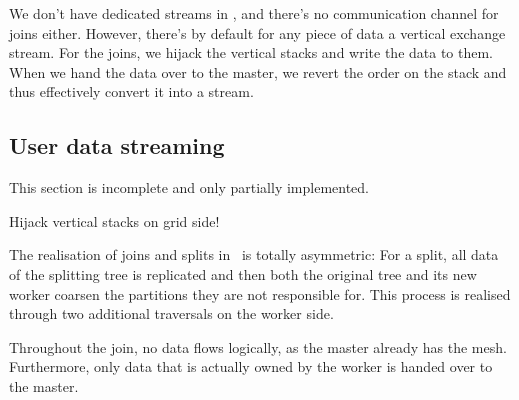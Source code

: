 We don't have dedicated streams in \Peano, and there's no communication channel
for joins either.
However, there's by default for any piece of data a vertical exchange stream.
For the joins, we hijack the vertical stacks and write the data to them.
When we hand the data over to the master, we revert the order on the stack and
thus effectively convert it into a stream.


\subsection{User data streaming}


\begin{remark}
 This section is incomplete and only partially implemented.
\end{remark}


Hijack vertical stacks on grid side!


\begin{remark}
 The realisation of joins and splits in \Peano\ is totally asymmetric: For a
 split, all data of the splitting tree is replicated and then both the original
 tree and its new worker coarsen the partitions they are not responsible for. 
 This process is realised through two additional traversals on the worker side.
 
 Throughout the join, no data flows logically, as the master already has the
 mesh. Furthermore, only data that is actually owned by the worker is handed
 over to the master.
\end{remark}
% 
% 
% 

